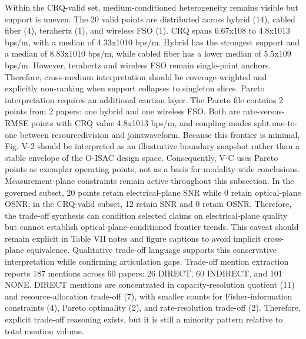 {}Within the CRQ-valid set, medium-conditioned heterogeneity remains visible but support is uneven. The 20 valid points are distributed across hybrid (14), cabled fiber (4), terahertz (1), and wireless FSO (1). CRQ spans 6.67x10\markdownRendererCircumflex{}8 to 4.8x10\markdownRendererCircumflex{}13 bps/m, with a median of 4.33x10\markdownRendererCircumflex{}10 bps/m. Hybrid has the strongest support and a median of 8.83x10\markdownRendererCircumflex{}10 bps/m, while cabled fiber has a lower median of 5.5x10\markdownRendererCircumflex{}9 bps/m. However, terahertz and wireless FSO remain single-point anchors. Therefore, cross-medium interpretation should be coverage-weighted and explicitly non-ranking when support collapses to singleton slices.\markdownRendererParagraphSeparator
{}Pareto interpretation requires an additional caution layer. The Pareto file contains 2 points from 2 papers: one hybrid and one wireless FSO. Both are rate-versus-RMSE points with CRQ value 4.8x10\markdownRendererCircumflex{}13 bps/m, and coupling modes split one-to-one between resource\markdownRendererUnderscore{}division and joint\markdownRendererUnderscore{}waveform. Because this frontier is minimal, Fig. V-2 should be interpreted as an illustrative boundary snapshot rather than a stable envelope of the O-ISAC design space. Consequently, V-C uses Pareto points as exemplar operating points, not as a basis for modality-wide conclusions.\markdownRendererParagraphSeparator
{}\markdownRendererParagraphSeparator
{}Measurement-plane constraints remain active throughout this subsection. In the governed subset, 20 points retain electrical-plane SNR while 0 retain optical-plane OSNR; in the CRQ-valid subset, 12 retain SNR and 0 retain OSNR. Therefore, the trade-off synthesis can condition selected claims on electrical-plane quality but cannot establish optical-plane-conditioned frontier trends. This caveat should remain explicit in Table VII notes and figure captions to avoid implicit cross-plane equivalence.\markdownRendererParagraphSeparator
{}Qualitative trade-off language supports this conservative interpretation while confirming articulation gaps. Trade-off mention extraction reports 187 mentions across 60 papers: 26 DIRECT, 60 INDIRECT, and 101 NONE. DIRECT mentions are concentrated in capacity-resolution quotient (11) and resource-allocation trade-off (7), with smaller counts for Fisher-information constraints (4), Pareto optimality (2), and rate-resolution trade-off (2). Therefore, explicit trade-off reasoning exists, but it is still a minority pattern relative to total mention volume.\markdownRendererParagraphSeparator

